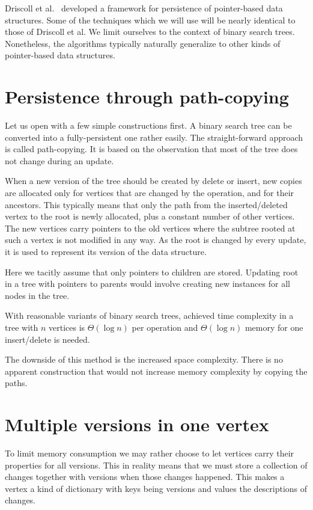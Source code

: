 Driscoll et al.~\cite{persistence-DSST} developed a framework for persistence of pointer-based data structures. 
Some of the techniques which we will use will be nearly identical to those of Driscoll et al.
We limit ourselves to the context of binary search trees. 
Nonetheless, the algorithms typically naturally generalize to other kinds of pointer-based data structures.

\section{Persistence through path-copying}

Let us open with a few simple constructions first. A binary search tree can be converted into a fully-persistent one rather easily.
The straight-forward approach is called path-copying. It is based on the observation that most of the tree does not change during an update.

When a new version of the tree should be created by delete or insert, new copies are allocated only for vertices that are changed by the operation, and for their ancestors. 
This typically means that only the path from the inserted/deleted vertex to the root is newly allocated, plus a constant number of other vertices. 
The new vertices carry pointers to the old vertices where the subtree rooted at such a vertex is not modified in any way.
As the root is changed by every update, it is used to represent its version of the data structure.

Here we tacitly assume that only pointers to children are stored. 
Updating root in a tree with pointers to parents would involve creating new instances for all nodes in the tree.

With reasonable variants of binary search trees, achieved time complexity in a tree with $n$ vertices is $\Theta(\log n)$ per operation and $\Theta(\log n)$ memory for one insert/delete is needed.

The downside of this method is the increased space complexity. 
There is no apparent construction that would not increase memory complexity by copying the paths.

\section{Multiple versions in one vertex}

To limit memory consumption we may rather choose to let vertices carry their properties for all versions. This in reality means that we must store a collection of changes together with versions when those changes happened. This makes a vertex a kind of dictionary with keys being versions and values the descriptions of changes.

